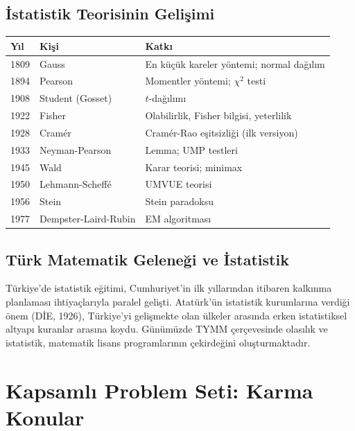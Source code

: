 \subsection{İstatistik Teorisinin Gelişimi}

\begin{center}
\renewcommand{\arraystretch}{1.4}
\small
\begin{tabular}{p{1.5cm}p{3cm}p{8cm}}
\hline
\textbf{Yıl} & \textbf{Kişi} & \textbf{Katkı} \\
\hline
1809 & Gauss & En küçük kareler yöntemi; normal dağılım \\
1894 & Pearson & Momentler yöntemi; $\chi^2$ testi \\
1908 & Student (Gosset) & $t$-dağılımı \\
1922 & Fisher & Olabilirlik, Fisher bilgisi, yeterlilik \\
1928 & Cramér & Cramér-Rao eşitsizliği (ilk versiyon) \\
1933 & Neyman-Pearson & Lemma; UMP testleri \\
1945 & Wald & Karar teorisi; minimax \\
1950 & Lehmann-Scheffé & UMVUE teorisi \\
1956 & Stein & Stein paradoksu \\
1977 & Dempster-Laird-Rubin & EM algoritması \\
\hline
\end{tabular}
\end{center}

\subsection{Türk Matematik Geleneği ve İstatistik}

Türkiye'de istatistik eğitimi, Cumhuriyet'in ilk yıllarından itibaren kalkınma planlaması ihtiyaçlarıyla paralel gelişti. Atatürk'ün istatistik kurumlarına verdiği önem (DİE, 1926), Türkiye'yi gelişmekte olan ülkeler arasında erken istatistiksel altyapı kuranlar arasına koydu. Günümüzde TYMM çerçevesinde olasılık ve istatistik, matematik lisans programlarının çekirdeğini oluşturmaktadır.

\section{Kapsamlı Problem Seti: Karma Konular}
\label{app:karma_problemler}

